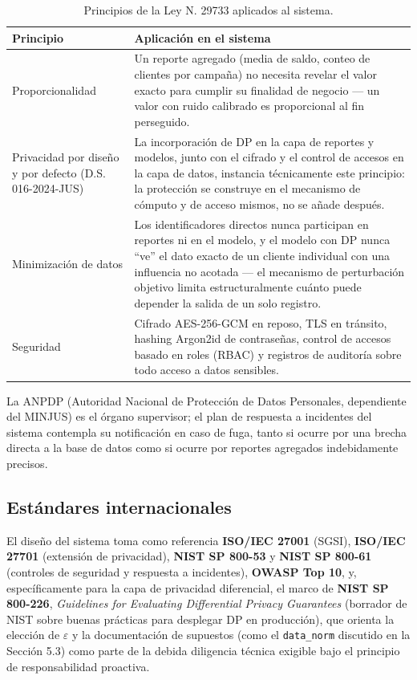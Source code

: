 \documentclass[11pt,a4paper]{article}
\newcommand{\eps}{\ensuremath{\varepsilon}}
\begin{document}
\begin{table}[htbp]
\centering
\small
\begin{tabularx}{\textwidth}{@{}p{3.2cm}X@{}}
\toprule
\textbf{Principio} & \textbf{Aplicación en el sistema} \\
\midrule
Proporcionalidad &
Un reporte agregado (media de saldo, conteo de clientes por campaña) no necesita revelar el valor
exacto para cumplir su finalidad de negocio --- un valor con ruido calibrado es proporcional al
fin perseguido. \\
\addlinespace
Privacidad por diseño y por defecto (D.S. 016-2024-JUS) &
La incorporación de DP en la capa de reportes y modelos, junto con el cifrado y el control de
accesos en la capa de datos, instancia técnicamente este principio: la protección se construye en
el mecanismo de cómputo y de acceso mismos, no se añade después. \\
\addlinespace
Minimización de datos &
Los identificadores directos nunca participan en reportes ni en el modelo, y el modelo con DP
nunca ``ve'' el dato exacto de un cliente individual con una influencia no acotada --- el
mecanismo de perturbación objetivo limita estructuralmente cuánto puede depender la salida de un
solo registro. \\
\addlinespace
Seguridad &
Cifrado AES-256-GCM en reposo, TLS en tránsito, hashing Argon2id de contraseñas, control de
accesos basado en roles (RBAC) y registros de auditoría sobre todo acceso a datos sensibles. \\
\bottomrule
\end{tabularx}
\caption{Principios de la Ley N.\textdegree{} 29733 aplicados al sistema.}
\end{table}

La ANPDP (Autoridad Nacional de Protección de Datos Personales, dependiente del MINJUS) es el
órgano supervisor; el plan de respuesta a incidentes del sistema contempla su notificación en
caso de fuga, tanto si ocurre por una brecha directa a la base de datos como si ocurre por
reportes agregados indebidamente precisos.

\subsection{Estándares internacionales}

El diseño del sistema toma como referencia \textbf{ISO/IEC 27001} (SGSI), \textbf{ISO/IEC 27701}
(extensión de privacidad), \textbf{NIST SP 800-53} y \textbf{NIST SP 800-61} (controles de
seguridad y respuesta a incidentes), \textbf{OWASP Top 10}, y, específicamente para la capa de
privacidad diferencial, el marco de \textbf{NIST SP 800-226}, \emph{Guidelines for Evaluating
Differential Privacy Guarantees} (borrador de NIST sobre buenas prácticas para desplegar DP en
producción), que orienta la elección de \eps{} y la documentación de supuestos (como el
\texttt{data\_norm} discutido en la Sección 5.3) como parte de la debida diligencia técnica
exigible bajo el principio de responsabilidad proactiva.
\end{document}

